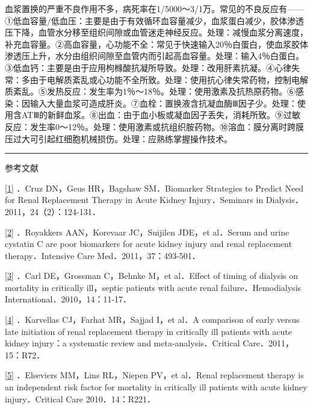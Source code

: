 血浆置换的严重不良作用不多，病死率在1/5000～3/1万。常见的不良反应有------①低血容量/低血压：主要是由于有效循环血容量减少，血浆蛋白减少，胶体渗透压下降，血管水分移至组织间隙或血管迷走神经反应。处理：减慢血浆分离速度，补充血容量。②高血容量，心功能不全：常见于快速输入20％白蛋白，使血浆胶体渗透压上升，水分由组织间隙至血管内而引起高血容量。处理：输入4％白蛋白。③低血钙：主要是由于应用枸橼酸抗凝所导致。处理：改用肝素抗凝。④心律失常：多由于电解质紊乱或心功能不全所致。处理：使用抗心律失常药物，控制电解质紊乱。⑤发热反应：发生率为1％～18％。处理：使用激素及抗热原药物。⑥感染：因输入大量血浆可造成肝炎。⑦血栓：置换液含抗凝血酶Ⅲ因子少。处理：使用含ATⅢ的新鲜血浆。⑧出血：由于血小板或凝血因子丢失，消耗所致。⑨过敏反应：发生率0～12％。处理：使用激素或抗组织胺药物。⑩溶血：膜分离时跨膜压过大可引起红细胞机械损伤。处理：应熟练掌握操作技术。

\begin{center}\rule{0.5\linewidth}{\linethickness}\end{center}

参考文献

\protect\hyperlink{text00018.htmlux5cux23ch1-17-back}{{[}1{]}} ．Cruz
DN，Geus HR，Bagshaw SM．Biomarker Strategies to Predict Need for Renal
Replacement Therapy in Acute Kidney Injury．Seminars in
Dialysis．2011，24（2）：124-131．

\protect\hyperlink{text00018.htmlux5cux23ch2-17-back}{{[}2{]}}
．Royakkers AAN，Korevaar JC，Suijilen JDE，et al．Serum and urine
cystatin C are poor biomarkers for acute kidney injury and renal
replacement therapy．Intensive Care Med．2011，37：493-501．

\protect\hyperlink{text00018.htmlux5cux23ch3-17-back}{{[}3{]}} ．Carl
DE，Grossman C，Behnke M，et al．Effect of timing of dialysis on
mortality in critically ill，septic patients with acute renal
failure．Hemodialysis International．2010，14：11-17．

\protect\hyperlink{text00018.htmlux5cux23ch4-17-back}{{[}4{]}}
．Karvellas CJ，Farhat MR，Sajjad I，et al．A comparison of early versus
late initiation of renal replacement therapy in critically ill patients
with acute kidney injury：a systematic review and
meta-analysis．Critical Care．2011，15：R72．

\protect\hyperlink{text00018.htmlux5cux23ch5-17-back}{{[}5{]}}
．Elseviers MM，Lins RL，Niepen PV，et al．Renal replacement therapy is
an independent risk factor for mortality in critically ill patients with
acute kidney injury．Critical Care 2010．14：R221．

